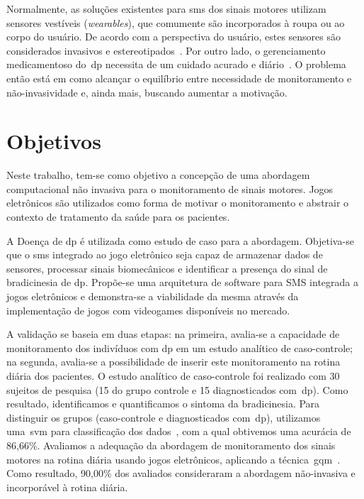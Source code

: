 Normalmente, as soluções existentes para \ac{sms} dos sinais motores utilizam sensores vestíveis (\textit{wearables}), que comumente são incorporados à roupa ou ao corpo do usuário. De acordo com a perspectiva do usuário, estes sensores são considerados invasivos e estereotipados~\cite{aarhus_negotiating_2010}. Por outro lado, o gerenciamento medicamentoso do~\ac{dp} necessita de um cuidado acurado e diário~\cite{quantitativeparkinson2011}. O problema então está em como alcançar o equilíbrio entre necessidade de monitoramento e não-invasividade e, ainda mais, buscando aumentar a motivação.

\section{Objetivos}
Neste trabalho, tem-se como objetivo a concepção de uma abordagem computacional não invasiva para o monitoramento de sinais motores. Jogos eletrônicos são utilizados como forma de motivar o monitoramento e abstrair o contexto de tratamento da saúde para os pacientes.

A Doença de \ac{dp} é utilizada como estudo de caso para a abordagem. Objetiva-se que o \ac{sms} integrado ao jogo eletrônico seja capaz de armazenar dados de sensores, processar sinais biomecânicos e identificar a presença do sinal de bradicinesia de \ac{dp}. Propõe-se uma arquitetura de software para SMS integrada a jogos eletrônicos e demonstra-se a viabilidade da mesma através da implementação de jogos com videogames disponíveis no mercado. 

A validação se baseia em duas etapas: na primeira, avalia-se a capacidade de monitoramento dos indivíduos com \ac{dp} em um estudo analítico de caso-controle; na segunda, avalia-se a possibilidade de inserir este monitoramento na rotina diária dos pacientes. O estudo analítico de caso-controle foi realizado com 30 sujeitos de pesquisa (15 do grupo controle e 15 diagnosticados com~\ac{dp}). Como resultado, identificamos e quantificamos o sintoma da bradicinesia. Para distinguir os grupos (caso-controle e diagnosticados com~\ac{dp}), utilizamos uma~\ac{svm} para classificação dos dados~\cite{datamining2005}, com a qual obtivemos uma acurácia de 86,66\%. Avaliamos a adequação da abordagem de monitoramento dos sinais motores na rotina diária usando jogos eletrônicos, aplicando a técnica~\ac{gqm}~\cite{van1999goal}. Como resultado, 90,00\% dos avaliados consideraram a abordagem não-invasiva e incorporável à rotina diária. 

